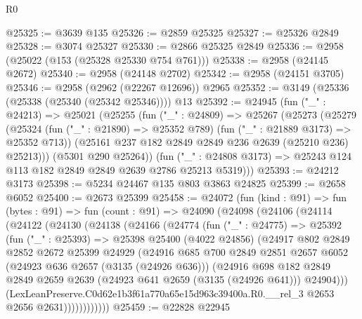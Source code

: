 \begin{lexlean}{R0}
\begin{coremodule}
@25325 := @3639 @135
@25326 := @2859 @25325
@25327 := @25326 @2849
@25328 := @3074 @25327
@25330 := @2866 @25325 @2849
@25336 := @2958 (@25022 (@153 (@25328 @25330 @754 @761)))
@25338 := @2958 (@24145 @2672)
@25340 := @2958 (@24148 @2702)
@25342 := @2958 (@24151 @3705)
@25346 := @2958 (@2962 (@22267 @12696)) @2965
@25352 := @3149 (@25336 (@25338 (@25340 (@25342 @25346)))) @13
@25392 := @24945
    (fun ("_" : @24213) =>
    @25021
      (@25255
        (fun ("_" : @24809) =>
        @25267
          (@25273
            (@25279
              (@25324 (fun ("_" : @21890) => @25352 @789) (fun ("_" : @21889 @3173) => @25352 @713))
              (@25161 @237 @182 @2849 @2849 @236 @2639 (@25210 @236) @25213)))
          (@5301 @290 @25264))
        (fun ("_" : @24808 @3173) => @25243 @124 @113 @182 @2849 @2849 @2639 @2786 @25213 @5319)))
@25393 := @24212 @3173
@25398 := @5234 @24467 @135 @803 @3863 @24825
@25399 := @2658 @6052
@25400 := @2673 @25399
@25458 := @24072
    (fun (kind : @91) =>
    fun (bytes : @91) =>
    fun (count : @91) =>
    @24090
      (@24098
        (@24106
          (@24114
            (@24122
              (@24130
                (@24138
                  (@24166
                    (@24774
                      (fun ("_" : @24775) =>
                      @25392
                        (fun ("_" : @25393) =>
                        @25398
                          @25400
                          (@4022 @24856)
                          (@24917
                            @802
                            @2849
                            @2852
                            @2672
                            @25399
                            @24929
                            (@24916
                              @685
                              @700
                              @2849
                              @2851
                              @2657
                              @6052
                              (@24923 @636 @2657 (@3135 (@24926 @636)))
                              (@24916
                                @698
                                @182
                                @2849
                                @2849
                                @2659
                                @2639
                                (@24923 @641 @2659 (@3135 (@24926 @641)))
                                @24904)))
                          (LexLeanPreserve.C0d62e1b3f61a770a65e15d963c39400a.R0.__rel_3
                            @2653
                            @2656
                            @2631))))))))))))
@25459 := @22828 @22945

\end{coremodule}
\end{lexlean}
